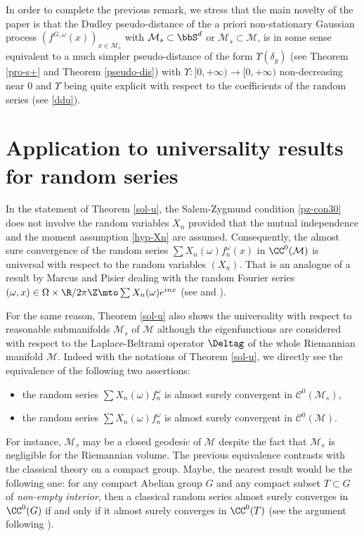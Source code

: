 In order to complete the previous remark, we stress that the main novelty of the paper is that the Dudley pseudo-distance of the a priori non-stationary Gaussian process $(f^{G,\omega}(x))_{x\in \mathcal{M}_s}$ with $\mathcal{M}_s\subset \bbS^d$ or $\mathcal{M}_s\subset \mathcal{M}$, is in some sense equivalent to a much simpler pseudo-distance of the form $\Upsilon(\delta_g)$ (see Theorem \ref{pro-s+} and Theorem \ref{pseudo-dis}) with $\Upsilon:[0,+\infty)\to [0,+\infty)$ non-decreasing near $0$ and $\Upsilon$ being quite explicit with respect to the coefficients of the random series (see \eqref{ddu}).
\section{Application to universality results for random series}\label{univer}

In the statement of Theorem \ref{sol-u}, the Salem-Zygmund condition \eqref{pz-con30} does not involve the random variables $X_n$ provided that the mutual independence and the moment assumption \eqref{hyp-Xn} are assumed. Consequently, the almost sure convergence of the random series $\sum X_n(\omega)f_n^\omega(x)$ in $\CC^0(\mathcal{M})$ is universal with respect to the random variables $(X_n)$. That is an analogue of a result by Marcus and Pisier dealing with the random Fourier series $(\omega,x)\in \Omega\times \R/ 2\pi \Z\mto \sum X_n(\omega) e^{inx}$ (see \cite[p.\,7--9]{pisier1981} and \cite[p.\,28, Cor.\,7.3]{pisier1977}).

For the same reason, Theorem \ref{sol-u} also shows the universality with respect to reasonable submanifolds $\mathcal{M}_s$ of $\mathcal{M}$
although the eigenfunctions are considered with respect to the Laplace-Beltrami operator $\Deltag$ of the whole Riemannian manifold $\mathcal{M}$. Indeed with the notations of Theorem \ref{sol-u}, we directly see the equivalence of the following two assertions:
\begin{itemize}
\item the random series $\sum X_n(\omega) f_n^{\omega}$ is almost surely convergent in $\mathcal{C}^0(\mathcal{M}_s)$,
\item the random series $\sum X_n(\omega) f_n^{\omega}$ is almost surely convergent in $\mathcal{C}^0(\mathcal{M})$.
\end{itemize}
For instance, $\mathcal{M}_s$ may be a closed geodesic of $\mathcal{M}$ despite the fact that $\mathcal{M}_s$ is negligible for the Riemannian volume.
The previous equivalence contrasts with the classical theory on a compact group.
Maybe, the nearest result would be the following one: for any compact Abelian group $G$ and any compact subset $T\subset G$ of \textit{non-empty interior}, then a classical random series almost surely converges in $\CC^0(G)$ if and only if it almost surely converges in $\CC^0(T)$ (see the argument following \cite[Th.\,13.3]{ledoux}).


